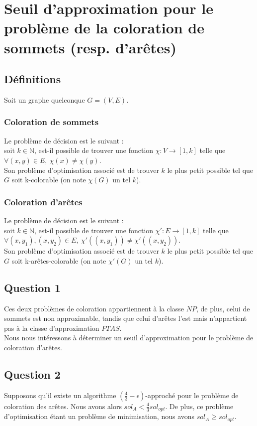 \section{Seuil d'approximation pour le problème de la coloration de sommets (resp.
d'arêtes)}\label{ex11}

\subsection{Définitions}\label{ex11_def}
Soit un graphe quelconque $G = (V,E)$.

\subsubsection{Coloration de sommets}\label{ex11_def_sommets}
Le problème de décision est le suivant :\\
soit $k \in \mathbb{N}$, est-il possible de trouver une fonction $\chi : V \rightarrow
[1,k]$ telle que $\forall (x,y) \in E,\ \chi(x) \neq \chi(y)$.\\
Son problème d'optimisation associé est de trouver $k$ le plus petit possible tel que $G$
soit k-colorable (on note $\chi(G)$ un tel $k$).

\subsubsection{Coloration d'arêtes}\label{ex11_def_aretes}
Le problème de décision est le suivant :\\
soit $k \in \mathbb{N}$, est-il possible de trouver une fonction $\chi' : E \rightarrow
[1,k]$ telle que $\forall (x,y_1),(x,y_2) \in E,\ \chi'((x,y_1)) \neq \chi'((x,y_2))$.\\
Son problème d'optimisation associé est de trouver $k$ le plus petit possible tel que $G$
soit k-arêtes-colorable (on note $\chi'(G)$ un tel $k$).

\subsection{Question 1}\label{ex11_q1}
Ces deux problèmes de coloration appartiennent à la classe $NP$, de plus, celui de
sommets est non approximable, tandis que celui d'arêtes l'est mais n'appartient pas à la 
classe d'approximation $PTAS$.\\
Nous nous intéressons à déterminer un seuil d'approximation pour le problème
de coloration d'arêtes.

\subsection{Question 2}\label{ex11_q2}
Supposons qu'il existe un algorithme $(\frac{4}{3} - \epsilon)$-approché pour le
problème de coloration des arêtes.
Nous avons alors $sol_A < \frac{4}{3} sol_{opt}$.
De plus, ce problème d'optimisation étant un problème de minimisation, nous avons $sol_A
\geq sol_{opt}$.

